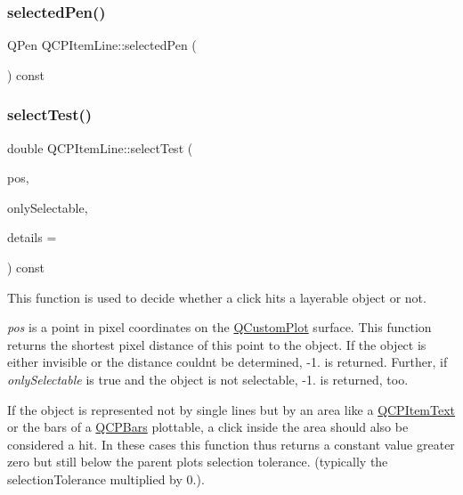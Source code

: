 \subsubsection{\texorpdfstring{selectedPen()}{selectedPen()}}
{\footnotesize\ttfamily Q\+Pen Q\+C\+P\+Item\+Line\+::selected\+Pen (\begin{DoxyParamCaption}{ }\end{DoxyParamCaption}) const\hspace{0.3cm}{\ttfamily [inline]}}

\mbox{\label{class_q_c_p_item_line_a8e02bfbca04fbcf3dbc375a2bf693229}} 
\subsubsection{\texorpdfstring{selectTest()}{selectTest()}}
{\footnotesize\ttfamily double Q\+C\+P\+Item\+Line\+::select\+Test (\begin{DoxyParamCaption}\item[{const Q\+PointF \&}]{pos,  }\item[{bool}]{only\+Selectable,  }\item[{Q\+Variant $\ast$}]{details = {} }\end{DoxyParamCaption}) const\hspace{0.3cm}{\ttfamily [virtual]}}

This function is used to decide whether a click hits a layerable object or not.

{\itshape pos} is a point in pixel coordinates on the \mbox{\hyperlink{class_q_custom_plot}{Q\+Custom\+Plot}} surface. This function returns the shortest pixel distance of this point to the object. If the object is either invisible or the distance couldn\textquotesingle{}t be determined, -\/1. is returned. Further, if {\itshape only\+Selectable} is true and the object is not selectable, -\/1. is returned, too.

If the object is represented not by single lines but by an area like a \mbox{\hyperlink{class_q_c_p_item_text}{Q\+C\+P\+Item\+Text}} or the bars of a \mbox{\hyperlink{class_q_c_p_bars}{Q\+C\+P\+Bars}} plottable, a click inside the area should also be considered a hit. In these cases this function thus returns a constant value greater zero but still below the parent plot\textquotesingle{}s selection tolerance. (typically the selection\+Tolerance multiplied by 0.).


